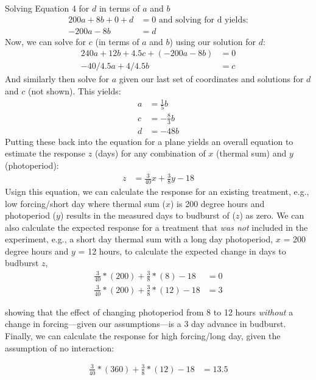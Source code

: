 \documentclass[11pt]{article}
\begin{document}
Solving Equation 4 for $d$ in terms of $a$ and $b$
\begin{align}
200a + 8b + 0 + d & = 0 \text{ and solving for d yields:} \\
-200a - 8b & =  d  %
\end{align}
Now, we can solve for $c$ (in terms of $a$ and $b$) using our solution for $d$:
\begin{align}
240a+12b+4.5c+(-200a - 8b) & = 0\\
-40/4.5a+4/4.5b & = c%
\end{align}
And similarly then solve for $a$ given our last set of coordinates and solutions for $d$ and $c$ (not shown). This yields:
\begin{align}
a & =\frac{1}{5}b\\
c & =-\frac{8}{3}b\\
d & =-48b
\end{align}
Putting these back into the equation for a plane yields an overall equation to estimate the response $z$ (days) for any combination of $x$ (thermal sum) and $y$ (photoperiod):
\begin{align}
z & = \frac{3}{40}x + \frac{3}{8}y-18
\end{align}
Usign this equation, we can calculate the response for an existing treatment, e.g., low forcing/short day where thermal sum ($x$) is 200 degree hours and photoperiod ($y$) results in the measured days to budburst of ($z$) as zero.  We can also calculate the expected response for a treatment that \textit{was not} included in the experiment, e.g., a short day thermal sum with a long day photoperiod, $x$ = 200 degree hours and $y$ = 12 hours, to calculate the expected change in days to budburst $z$,
\begin{align}
\frac{3}{40}*(200) + \frac{3}{8}*(8)-18 &=0\\ 
\frac{3}{40}*(200) + \frac{3}{8}*(12)-18 &=3 
\end{align}

showing that the effect of changing photoperiod from 8 to 12 hours \textit{without} a change in forcing---given our assumptions---is a 3 day advance in budburst.\\ 

Finally, we can calculate the response for high forcing/long day, given the assumption of no interaction:
 
\begin{align}
\frac{3}{40}*(360) + \frac{3}{8}*(12)-18 &=13.5
\end{align}
\end{document}
